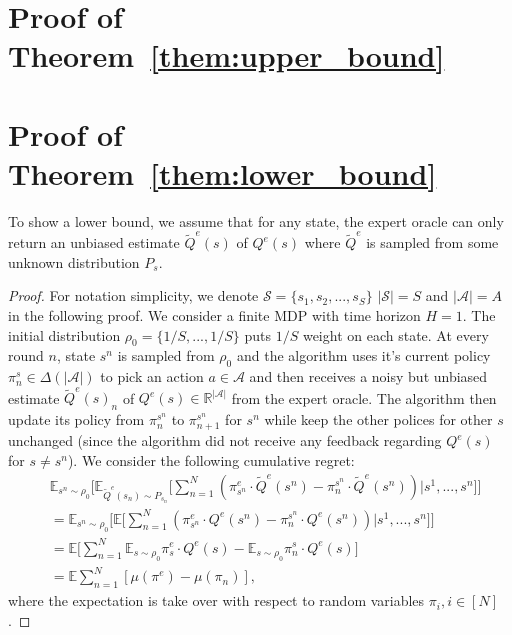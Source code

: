 \section{Proof of Theorem~\ref{them:upper_bound}}


\section{Proof of Theorem~\ref{them:lower_bound}}
To show a lower bound, we assume that for any state, the expert oracle can only return an unbiased estimate $\tilde{Q}^e(s)$ of $Q^e(s)$ where $\tilde{Q}^e$ is sampled from some unknown distribution $P_s$. 
\begin{proof}
For notation simplicity, we denote $\mathcal{S} = \{s_1, s_2, ..., s_S\}$ $|\mathcal{S}|= S$ and $|\mathcal{A}| = A$ in the following proof. We consider a finite MDP with time horizon $H = 1$. The initial distribution $\rho_0 = \{1/S, ..., 1/S\}$ puts $1/S$ weight on each state. At every round $n$, state $s^n$ is sampled from $\rho_0$ and the algorithm uses it's current policy $\pi_{n}^s\in\Delta(|\mathcal{A}|)$ to pick an action $a\in\mathcal{A}$ and then receives a noisy but unbiased estimate $\tilde{Q}^e(s)_n$ of $Q^e(s)\in\mathbb{R}^{|\mathcal{A}|}$ from the expert oracle. The algorithm then update its policy from $\pi_{n}^{s^n}$ to $\pi_{n+1}^{s^n}$ for $s^n$ while keep the other polices for other $s$ unchanged (since the algorithm did not receive any feedback regarding $Q^e(s)$ for $s\neq s^{n}$). We consider the following cumulative regret:
\begin{align}
&\mathbb{E}_{s^n\sim\rho_0}\Big[\mathbb{E}_{\tilde{Q}^e(s_n)\sim P_{s_n}}\big[\sum_{n=1}^N( \pi^e_{s^n} \cdot \tilde{Q}^e(s^n) - \pi_n^{s^n}\cdot \tilde{Q}^e(s^n))|s^1,...,s^n\big]\Big] \nonumber\\
&= \mathbb{E}_{s^n\sim \rho_0}\Big[\mathbb{E}\big[\sum_{n=1}^N (\pi_{s^n}^e\cdot Q^e(s^n) - \pi_n^{s^n}\cdot Q^e(s^n))|s^1,...,s^n\big]\Big] \nonumber\\
&= \mathbb{E}\big[\sum_{n=1}^N\mathbb{E}_{s\sim\rho_0}\pi_s^e\cdot Q^e(s) - \mathbb{E}_{s\sim \rho_0}\pi_n^s\cdot Q^e(s)\big] \nonumber\\
& = \mathbb{E}\sum_{n=1}^N [\mu(\pi^e) - \mu(\pi_n)],
\end{align}where the expectation is take over with respect to random variables $\pi_i,i\in[N]$. 

\end{proof}
